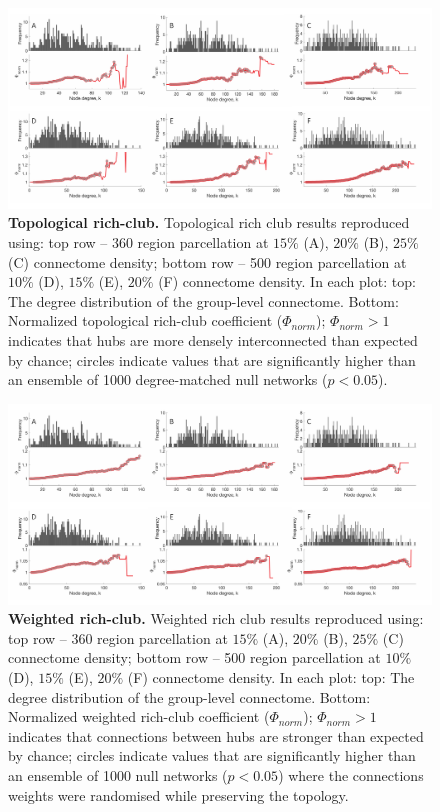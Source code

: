 \begin{figure}[h!]
\begin{center}
\includegraphics[width=1\textwidth]{Chapter5/SFigure1.pdf}%
\end{center}
\caption{\textbf{Topological rich-club.} 
Topological rich club results reproduced using: top row -- 360 region parcellation at $15\%$ (A), $20\%$ (B), $25\%$ (C) connectome density; bottom row -- 500 region parcellation at $10\%$ (D), $15\%$ (E), $20\%$ (F) connectome density. In each plot: top: The degree distribution of the group-level connectome. Bottom: Normalized topological rich-club coefficient ($\Phi_{norm}$); $\Phi_{norm}>1$ indicates that hubs are more densely interconnected than expected by chance; circles indicate values that are significantly higher than an ensemble of 1000 degree-matched null networks ($p<0.05$).}
\label{fig:Ch5SFig1}
\end{figure}

\begin{figure}[h!]
\begin{center}
\includegraphics[width=1\textwidth]{Chapter5/SFigure2.pdf}%
\end{center}
\caption{\textbf{Weighted rich-club.} 
Weighted rich club results reproduced using: top row -- 360 region parcellation at $15\%$ (A), $20\%$ (B), $25\%$ (C) connectome density; bottom row -- 500 region parcellation at $10\%$ (D), $15\%$ (E), $20\%$ (F) connectome density. In each plot: top: The degree distribution of the group-level connectome. Bottom: Normalized weighted rich-club coefficient ($\Phi_{norm}$); $\Phi_{norm}>1$ indicates that connections between hubs are stronger than expected by chance; circles indicate values that are significantly higher than an ensemble of 1000 null networks ($p<0.05$) where the connections weights were randomised while preserving the topology. }
\label{fig:Ch5SFig2}
\end{figure}

